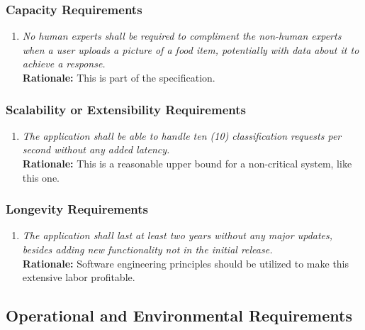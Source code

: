 \documentclass[]{article}
\begin{document}
\subsubsection{Capacity Requirements}
\label{ssub:capacity_requirements}
\begin{enumerate}[{PR-C}1. ]
	\item \textit{No human experts shall be required to compliment the non-human experts when a user uploads a picture of a food item, potentially with data about it to achieve a response.} \\ \textbf{Rationale:} This is part of the specification.
\end{enumerate}

\subsubsection{Scalability or Extensibility Requirements}
\label{ssub:scalability_or_extensibility_requirements}
\begin{enumerate}[{PR-SE}1. ]
    \item \textit{The application shall be able to handle ten (10) classification requests per second without any added latency.} \\ \textbf{Rationale:} This is a reasonable upper bound for a non-critical system, like this one.
\end{enumerate}

\subsubsection{Longevity Requirements}
\label{ssub:longevity_requirements}
\begin{enumerate}[{PR-L}1. ]
	\item \textit{The application shall last at least two years without any major updates, besides adding new functionality not in the initial release.} \\ \textbf{Rationale:} Software engineering principles should be utilized to make this extensive labor profitable.
\end{enumerate}


\subsection{Operational and Environmental Requirements}
\label{sub:operational_and_environmental_requirements}
\end{document}
